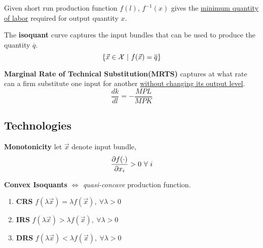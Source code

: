 \documentclass[]{article}
\begin{document}
            \begin{remark}
                Given short run production function $f(l)$, $f^{-1}(x)$ gives the \ul{minimum quantity of labor} required for output quantity $x$.
            \end{remark}
            
            \begin{definition}
                The \textbf{isoquant} curve captures the input bundles that can be used to produce the quantity $\overline{q}$.
                \[
                    \{ \vec{x} \in \mathcal{{X}}\ | \ f(\vec{x}) = \overline{q} \}
                \]
            \end{definition}
            
            \begin{definition}
                \textbf{Marginal Rate of Technical Substitution(MRTS)} captures at what rate can a firm substitute one input for another \ul{without changing its output level}.
                \[
                    \frac{dk}{dl} = -\frac{MPL}{MPK}
                \]
            \end{definition}
            
        \subsection{Technologies}
            \begin{definition}
                \textbf{Monotonicity} let $\vec{x}$ denote input bundle,
                \[
                    \frac{\partial{f(\cdot)}}{\partial{x_i}} > 0 \ \forall \ i
                \]
            \end{definition}
            
            \begin{definition}
                \textbf{Convex Isoquants} $\iff$ \emph{quasi-concave} production function.
            \end{definition}
            
            \begin{definition}\quad
                \begin{enumerate}
                    \item \textbf{CRS} $f(\lambda \vec{x}) = \lambda f(\vec{x}),\ \forall \lambda > 0$
                    \item \textbf{IRS} $f(\lambda \vec{x}) > \lambda f(\vec{x}),\ \forall \lambda > 0$
                    \item \textbf{DRS} $f(\lambda \vec{x}) < \lambda f(\vec{x}),\ \forall \lambda > 0$
                \end{enumerate}
            \end{definition}
            
\end{document}

